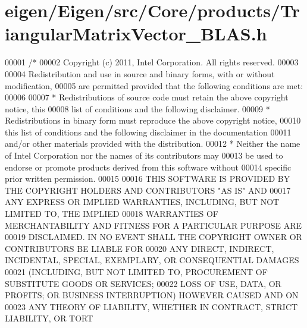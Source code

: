 \hypertarget{eigen_2_eigen_2src_2_core_2products_2_triangular_matrix_vector___b_l_a_s_8h_source}{}\section{eigen/\+Eigen/src/\+Core/products/\+Triangular\+Matrix\+Vector\+\_\+\+B\+L\+AS.h}
\label{eigen_2_eigen_2src_2_core_2products_2_triangular_matrix_vector___b_l_a_s_8h_source}

\begin{DoxyCode}
00001 \textcolor{comment}{/*}
00002 \textcolor{comment}{ Copyright (c) 2011, Intel Corporation. All rights reserved.}
00003 \textcolor{comment}{}
00004 \textcolor{comment}{ Redistribution and use in source and binary forms, with or without modification,}
00005 \textcolor{comment}{ are permitted provided that the following conditions are met:}
00006 \textcolor{comment}{}
00007 \textcolor{comment}{ * Redistributions of source code must retain the above copyright notice, this}
00008 \textcolor{comment}{   list of conditions and the following disclaimer.}
00009 \textcolor{comment}{ * Redistributions in binary form must reproduce the above copyright notice,}
00010 \textcolor{comment}{   this list of conditions and the following disclaimer in the documentation}
00011 \textcolor{comment}{   and/or other materials provided with the distribution.}
00012 \textcolor{comment}{ * Neither the name of Intel Corporation nor the names of its contributors may}
00013 \textcolor{comment}{   be used to endorse or promote products derived from this software without}
00014 \textcolor{comment}{   specific prior written permission.}
00015 \textcolor{comment}{}
00016 \textcolor{comment}{ THIS SOFTWARE IS PROVIDED BY THE COPYRIGHT HOLDERS AND CONTRIBUTORS "AS IS" AND}
00017 \textcolor{comment}{ ANY EXPRESS OR IMPLIED WARRANTIES, INCLUDING, BUT NOT LIMITED TO, THE IMPLIED}
00018 \textcolor{comment}{ WARRANTIES OF MERCHANTABILITY AND FITNESS FOR A PARTICULAR PURPOSE ARE}
00019 \textcolor{comment}{ DISCLAIMED. IN NO EVENT SHALL THE COPYRIGHT OWNER OR CONTRIBUTORS BE LIABLE FOR}
00020 \textcolor{comment}{ ANY DIRECT, INDIRECT, INCIDENTAL, SPECIAL, EXEMPLARY, OR CONSEQUENTIAL DAMAGES}
00021 \textcolor{comment}{ (INCLUDING, BUT NOT LIMITED TO, PROCUREMENT OF SUBSTITUTE GOODS OR SERVICES;}
00022 \textcolor{comment}{ LOSS OF USE, DATA, OR PROFITS; OR BUSINESS INTERRUPTION) HOWEVER CAUSED AND ON}
00023 \textcolor{comment}{ ANY THEORY OF LIABILITY, WHETHER IN CONTRACT, STRICT LIABILITY, OR TORT}

\end{DoxyCode}

